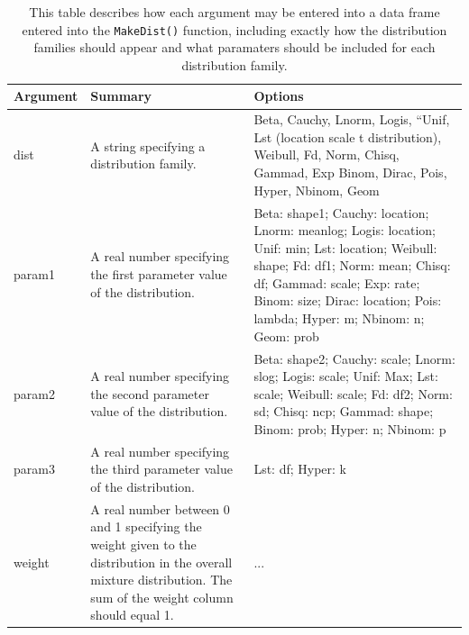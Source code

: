 \documentclass[11pt,notitlepage]{isuthesis}
\begin{document}
\begin{table}
\begin{center}
    \begin{tabular}{ | l | p{4cm} | p{7cm} |}
    \hline
    \textbf{Argument} & \textbf{Summary} & \textbf{Options} \\ \hline
    dist & A string specifying a distribution family.  & Beta, Cauchy,
    Lnorm, Logis, “Unif, Lst (location scale t distribution),
    Weibull, Fd, Norm,  Chisq,
    Gammad, Exp
	 Binom, Dirac, Pois, Hyper, Nbinom, Geom \\ \hline
    param1 & A real number specifying the first parameter value of the
    distribution. & Beta: shape1;
	Cauchy: location;
	Lnorm: meanlog;
	Logis: location;
	Unif: min;
	Lst: location;
	Weibull: shape;
	Fd: df1;
	Norm: mean;
	Chisq: df;
	Gammad: scale;
	Exp: rate;
	Binom: size;
	Dirac: location;
	Pois: lambda;
	Hyper: m;
	Nbinom: n;
	Geom: prob
     \\ \hline
    param2 & A real number specifying the second parameter value of the
    distribution. & Beta: shape2;
	Cauchy: scale;
	Lnorm: slog;
	Logis: scale;
	Unif: Max;
	Lst: scale;
	Weibull: scale;
	Fd: df2;
	Norm: sd;
	Chisq: ncp;
	Gammad: shape;
	Binom: prob;
	Hyper: n;
	Nbinom: p \\
    \hline
    param3 & A real number specifying the third parameter value of the
    distribution. & Lst: df;
	Hyper: k \\
	\hline
	weight & A real number between 0 and 1 specifying the weight given to the
	distribution in the overall mixture distribution. The sum of the weight
	column should equal 1. & ...
	\\
	\hline
    \end{tabular}
    \begin{center}
\begin{minipage}{10cm}
\captionsetup{font=scriptsize}
  \caption[Arugments of \texttt{MakeDist()} function]{This table describes how
  each argument may be entered into a data frame entered into the 
  \texttt{MakeDist()} function, including
  exactly how the distribution families should appear and what paramaters should
  be included for each distribution family.}
  \label{table:mixfams}
  \end{minipage}
  \end{center}
\end{center}
\end{table}
\end{document}
